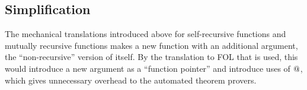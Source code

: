 \begin{comment}
\subsection{Mutually Recursive Functions}

You can also mechanically transform mutually recursive functions to be
defined in terms of \hs{fix}. The functions \hs{even} and \hs{odd}
defined below, which determines if a \hs{Nat} is even, and odd,
respectively, are straightforwardly written by mutual recursion:

\begin{code}
even :: Nat -> Bool           odd :: Nat -> Bool
even Z     = True             odd Z     = False
even (S x) = odd x            odd (S x) = even x
\end{code}

To write these functions in terms of fix, as an additional argument,
the take a tuple of ``non-recursive'' copies of themselves.

\begin{code}
evenToFix :: (Nat -> Bool,Nat -> Bool) -> Nat -> Bool
evenToFix (evenUnFix,oddUnFix) Z     = True
evenToFix (evenUnFix,oddUnFix) (S x) = oddUnFix x

oddToFix :: (Nat -> Bool,Nat -> Bool) -> Nat -> Bool
oddToFix (evenUnFix,oddUnFix) Z     = True
oddToFix (evenUnFix,oddUnFix) (S x) = evenUnFix x
\end{code}

Here the prefix \hs{ToFix} means that it is a function subject to be
\hs{fix}-ed, and \hs{UnFix} means that it is the ``non-recursive''
function. The functions above can now be \hs{fix}-ed by giving the
tuple as an argument to both of them:

\begin{code}
even',odd' :: Nat -> Bool
(even',odd') = fix (\t -> (evenToFix t,oddToFix t))
\end{code}

This encoding makes \hs{even'} denotationally equal to \hs{even} and
the same relation hols for \hs{odd'} and \hs{odd}.
\end{comment}

\subsection{Simplification}

The mechanical translations introduced above for self-recursive
functions and mutually recursive functions makes a new function with
an additional argument, the ``non-recursive'' version of itself. By
the translation to FOL that is used, this would introduce a new
argument as a ``function pointer'' and introduce uses of $@$,
which gives unnecessary overhead to the automated theorem
provers.

